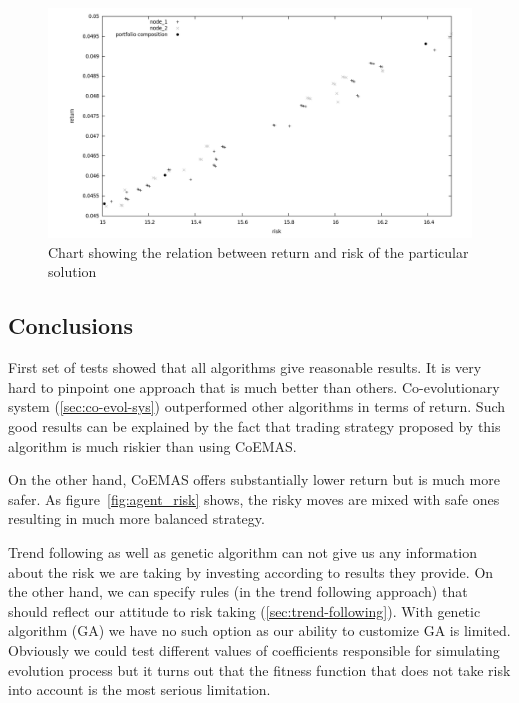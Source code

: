 \begin{figure}[ht]
  \begin{center}
    \includegraphics[scale=.3]{pareto_coemas.png}
  \end{center}
  \caption{Chart showing the relation between return and risk of the particular solution}
  \label{fig:pareto_coemas}
\end{figure}


\subsection{Conclusions}

First set of tests showed that all algorithms give reasonable results.
It is very hard to pinpoint one approach that is much better than others.
Co-evolutionary system (\ref{sec:co-evol-sys}) outperformed other algorithms in terms of return.
Such good results can be explained by the fact that trading strategy proposed by this algorithm is much riskier than using CoEMAS.
  
On the other hand, CoEMAS offers substantially lower return but is much more safer.
As figure~\ref{fig:agent_risk} shows, the risky moves are mixed with safe ones resulting in much more balanced strategy.

Trend following as well as genetic algorithm can not give us any information about the risk we are taking by investing according to results they provide.
On the other hand, we can specify rules (in the trend following approach) that should reflect our attitude to risk taking (\ref{sec:trend-following}).
With genetic algorithm (GA) we have no such option as our ability to customize GA is limited.
Obviously we could test different values of coefficients responsible for simulating evolution process but it turns out that the fitness function that does not take risk into
account is the most serious limitation.



